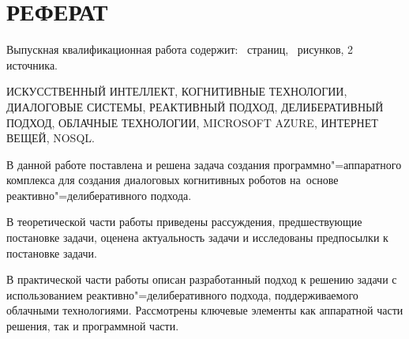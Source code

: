 \chapter*{РЕФЕРАТ}
Выпускная квалификационная работа содержит: \pageref{LastPage}\ страниц, \totalfigures\ рисунков, 2 источника.

ИСКУССТВЕННЫЙ ИНТЕЛЛЕКТ, КОГНИТИВНЫЕ ТЕХНОЛОГИИ, ДИАЛОГОВЫЕ СИСТЕМЫ, РЕАКТИВНЫЙ ПОДХОД, ДЕЛИБЕРАТИВНЫЙ ПОДХОД, ОБЛАЧНЫЕ ТЕХНОЛОГИИ, MICROSOFT AZURE, ИНТЕРНЕТ ВЕЩЕЙ, NOSQL.

В данной работе поставлена и решена задача создания программно"=аппаратного комплекса для создания диалоговых когнитивных роботов на~основе реактивно"=делиберативного подхода.

В теоретической части работы приведены рассуждения, предшествующие постановке задачи, оценена актуальность задачи и исследованы предпосылки к постановке задачи.

В практической части работы описан разработанный подход к решению задачи с использованием реактивно"=делиберативного подхода, поддерживаемого облачными технологиями. Рассмотрены ключевые элементы как аппаратной части решения, так и программной части.
\pagebreak